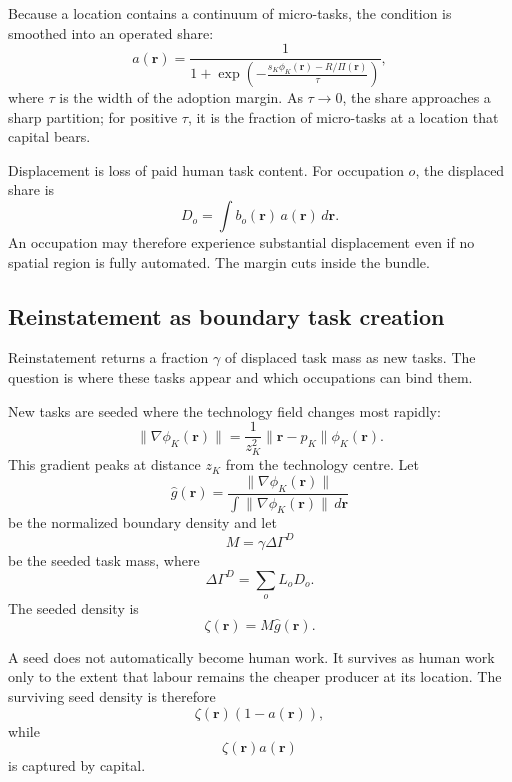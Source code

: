 \documentclass[12pt, a4paper]{article}
\begin{document}
Because a location contains a continuum of micro-tasks, the condition is
smoothed into an operated share:
\begin{equation}
  a(\mathbf{r})
  =
  \frac{
    1
  }{
    1+
    \exp
    \left(
      -
      \frac{
        s_K\phi_K(\mathbf{r}) - R/\Pi(\mathbf{r})
      }{\tau}
    \right)
  },
  \label{eq:soft-switch}
\end{equation}
where $\tau$ is the width of the adoption margin. As $\tau \to 0$, the
share approaches a sharp partition; for positive $\tau$, it is the
fraction of micro-tasks at a location that capital bears.

Displacement is loss of paid human task content. For occupation $o$,
the displaced share is
\begin{equation}
  D_o
  =
  \int b_o(\mathbf{r})\,a(\mathbf{r})\,d\mathbf{r}.
  \label{eq:displaced}
\end{equation}
An occupation may therefore experience substantial displacement even if
no spatial region is fully automated. The margin cuts inside the bundle.

\subsection{Reinstatement as boundary task creation}
\label{sec:reinstatement}

Reinstatement returns a fraction $\gamma$ of displaced task mass as new
tasks. The question is where these tasks appear and which occupations
can bind them.

New tasks are seeded where the technology field changes most rapidly:
\begin{equation}
  \|\nabla\phi_K(\mathbf{r})\|
  =
  \frac{1}{z_K^2}
  \|\mathbf{r}-p_K\|
  \phi_K(\mathbf{r}).
  \label{eq:gradient-phi}
\end{equation}
This gradient peaks at distance $z_K$ from the technology centre. Let
\[
  \hat g(\mathbf{r})
  =
  \frac{
    \|\nabla\phi_K(\mathbf{r})\|
  }{
    \int \|\nabla\phi_K(\mathbf{r})\|\,d\mathbf{r}
  }
\]
be the normalized boundary density and let
\[
  M = \gamma \Delta\Gamma^D
\]
be the seeded task mass, where
\[
  \Delta\Gamma^D = \sum_o L_o D_o.
\]
The seeded density is
\[
  \zeta(\mathbf{r}) = M\hat g(\mathbf{r}).
\]

A seed does not automatically become human work. It survives as human
work only to the extent that labour remains the cheaper producer at its
location. The surviving seed density is therefore
\[
  \zeta(\mathbf{r})(1-a(\mathbf{r})),
\]
while
\[
  \zeta(\mathbf{r})a(\mathbf{r})
\]
is captured by capital.
\end{document}
